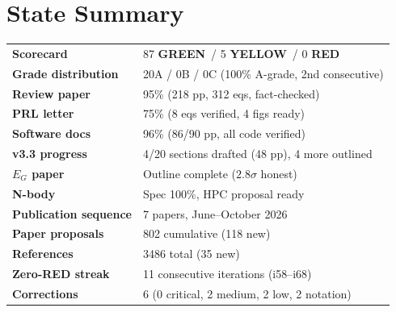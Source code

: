 \documentclass[11pt,a4paper]{article}
\newcommand{\GREEN}{\textcolor{dfdgreen}{\textbf{GREEN}}}
\newcommand{\YELLOW}{\textcolor{dfdyellow}{\textbf{YELLOW}}}
\newcommand{\RED}{\textcolor{dfdred}{\textbf{RED}}}
\begin{document}
\section{State Summary}

\begin{tcolorbox}[colback=green!5,colframe=dfdgreen,title=i68 State]
\begin{center}
\begin{tabular}{ll}
\textbf{Scorecard} & 87 \GREEN\ / 5 \YELLOW\ / 0 \RED \\
\textbf{Grade distribution} & 20A / 0B / 0C (100\% A-grade, 2nd consecutive) \\
\textbf{Review paper} & 95\% (218 pp, 312 eqs, fact-checked) \\
\textbf{PRL letter} & 75\% (8 eqs verified, 4 figs ready) \\
\textbf{Software docs} & 96\% (86/90 pp, all code verified) \\
\textbf{v3.3 progress} & 4/20 sections drafted (48 pp), 4 more outlined \\
\textbf{$E_G$ paper} & Outline complete ($2.8\sigma$ honest) \\
\textbf{N-body} & Spec 100\%, HPC proposal ready \\
\textbf{Publication sequence} & 7 papers, June--October 2026 \\
\textbf{Paper proposals} & 802 cumulative (118 new) \\
\textbf{References} & 3486 total (35 new) \\
\textbf{Zero-RED streak} & 11 consecutive iterations (i58--i68) \\
\textbf{Corrections} & 6 (0 critical, 2 medium, 2 low, 2 notation) \\
\end{tabular}
\end{center}
\end{tcolorbox}
\end{document}
